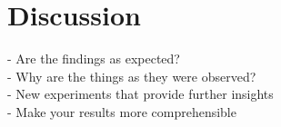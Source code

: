 %
%
\chapter{Discussion}\label{sec:Discussion}
- Are the findings as expected? \\
- Why are the things as they were observed? \\
- New experiments that provide further insights \\
- Make your results more comprehensible